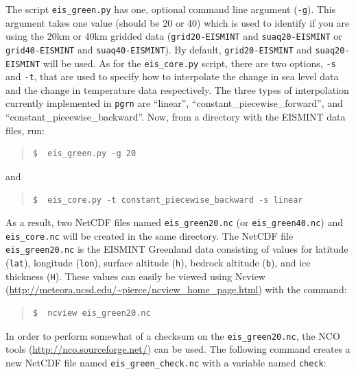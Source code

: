 \documentclass[11pt,final]{amsart}
\begin{document}
\noindent The script \verb|eis_green.py| has one, optional command line argument (\verb|-g|). This argument takes one value (should be 20 or 40) which is used to identify if you are using the 20km or 40km gridded data (\verb|grid20-EISMINT| and \verb|suaq20-EISMINT| or \verb|grid40-EISMINT| and \verb|suaq40-EISMINT|). By default, \verb|grid20-EISMINT| and \verb|suaq20-EISMINT| will be used. As for the \verb|eis_core.py| script, there are two options, \verb|-s| and \verb|-t|, that are used to specify how to interpolate the change in sea level data and the change in temperature data respectively. The three types of interpolation currently implemented in \verb|pgrn| are ``linear'', ``constant\_piecewise\_forward'', and ``constant\_piecewise\_backward''.  Now, from a directory with the EISMINT data files, run:

\small\begin{quote}\begin{verbatim}
$  eis_green.py -g 20
\end{verbatim}
\end{quote}\normalsize

and

\small\begin{quote}\begin{verbatim}
$  eis_core.py -t constant_piecewise_backward -s linear
\end{verbatim}
\end{quote}\normalsize

\noindent As a result, two NetCDF files named \verb|eis_green20.nc| (or \verb|eis_green40.nc|) and \verb|eis_core.nc| will be created in the same directory.  The NetCDF file \verb|eis_green20.nc| is the EISMINT Greenland data consisting of values for latitude (\verb|lat|), longitude (\verb|lon|), surface altitude (\verb|h|), bedrock altitude (\verb|b|), and ice thickness (\verb|H|).  These values can easily be viewed using Ncview (\url{http://meteora.ucsd.edu/~pierce/ncview_home_page.html}) with the command:

\small\begin{quote}\begin{verbatim}
$  ncview eis_green20.nc
\end{verbatim}
\end{quote}\normalsize

\noindent In order to perform somewhat of a checksum on the \verb|eis_green20.nc|, the NCO tools (\url{http://nco.sourceforge.net/}) can be used.  The following command creates a new NetCDF file named \verb|eis_green_check.nc| with a variable named \verb|check|:
\end{document}
